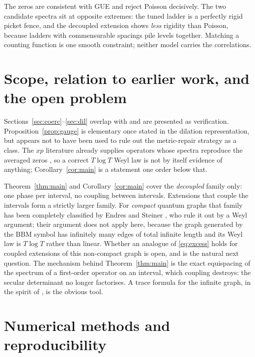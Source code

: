 \documentclass[11pt,a4paper]{article}
\theoremstyle{remark}
\begin{document}
The zeros are consistent with GUE and reject Poisson decisively. The two candidate spectra sit at
opposite extremes: the tuned ladder is a perfectly rigid picket fence, and the decoupled extension
shows \emph{less} rigidity than Poisson, because ladders with commensurable spacings pile levels
together. Matching a counting function is one smooth constraint; neither model carries the
correlations.

\section{Scope, relation to earlier work, and the open problem}\label{sec:open}

Sections~\ref{sec:coerc}--\ref{sec:dil} overlap with \cite{Liu2026} and are presented as
verification. Proposition~\ref{prop:gauge} is elementary once stated in the dilation
representation, but appears not to have been used to rule out the metric-repair strategy as a
class. The $xp$ literature already supplies operators whose spectra reproduce the averaged zeros
\cite{Sierra2008,Sierra2011,BerryKeating1999}, so a correct $T\log T$ Weyl law is not by itself
evidence of anything; Corollary~\ref{cor:main} is a statement one order below that.

Theorem~\ref{thm:main} and Corollary~\ref{cor:main} cover the \emph{decoupled} family only: one
phase per interval, no coupling between intervals. Extensions that couple the intervals form a
strictly larger family. For \emph{compact} quantum graphs that family has been completely
classified by Endres and Steiner \cite{EndresSteiner2010}, who rule it out by a Weyl argument;
their argument does not apply here, because the graph generated by the BBM symbol has infinitely
many edges of total infinite length and its Weyl law is $T\log T$ rather than linear. Whether an
analogue of \eqref{eq:excess} holds for coupled extensions of this non-compact graph is open, and
is the natural next question. The mechanism behind Theorem~\ref{thm:main} is the exact
equispacing of the spectrum of a first-order operator on an interval, which coupling destroys: the
secular determinant no longer factorises. A trace formula for the infinite graph, in the spirit of
\cite{EndresSteiner2010}, is the obvious tool.

\appendix
\section{Numerical methods and reproducibility}
\end{document}

